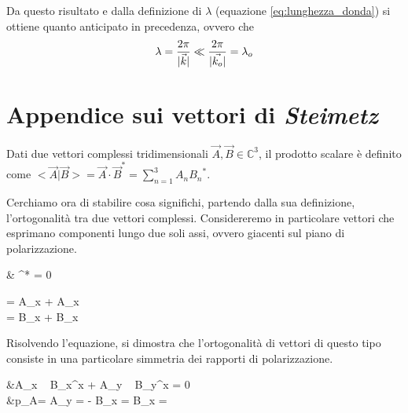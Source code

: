 		Da questo risultato e dalla definizione di $\lambda$ (equazione \ref{eq:lunghezza_donda}) si ottiene quanto anticipato in precedenza, ovvero che
		\begin{equation*} \begin{split}
			& \lambda = \frac{2\pi}{|\vec{k}|} \ll \frac{2\pi}{|\vec{k_o}|} = \lambda_o \\
		\end{split} \end{equation*}

\section{Appendice sui vettori di \emph{Steimetz}}
Dati due vettori complessi tridimensionali $\vec{A}, \vec{B} \in \mathbb{C}^3$, il prodotto scalare è definito come $<\vec{A} | \vec{B}> = \vec{A} \cdot \vec{B}^* = \sum_{n=1}^3 A_n {B_n}^*$.

Cerchiamo ora di stabilire cosa significhi, partendo dalla sua definizione,  l'ortogonalità tra due vettori complessi. Considereremo in particolare vettori che esprimano componenti lungo due soli assi, ovvero giacenti sul piano di polarizzazione.

\begin{esp}
	&  \perp {} \Leftrightarrow {} \cdot {}^* = 0 \quad {}\quad \begin{dcases}
		 = A_{x\prime} \prime + A_x \prime \\
		 = B_{x\prime} \prime + B_x \prime
	\end{dcases}
\end{esp}

Risolvendo l'equazione, si dimostra che l'ortogonalità di vettori di questo tipo consiste in una particolare simmetria dei rapporti di polarizzazione.
\begin{esp}
	&A_{x\prime} ~ B_{x\prime}^x + A_{y\prime} ~ B_{y\prime}^x = 0 \\
	&p_A\prime = \jmath {} { A_{y\prime} }
		= - \jmath {} { B_{x\prime} }
		=  {\jmath {} { B_{x\prime} }} = 
\end{esp}

